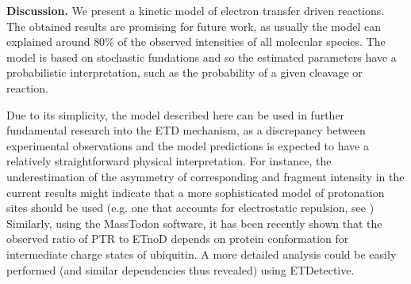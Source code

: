 \documentclass{llncs}
\begin{document}
\textbf{Discussion.}
We present a kinetic model of electron transfer driven reactions. The obtained results are promising for future work, as usually the model can explained around $80\%$ of the observed intensities of all molecular species. The model is based on stochastic fundations and so the estimated parameters have a probabilistic interpretation, such as the probability of a given cleavage or reaction.

Due to its simplicity, the model described here can be used in further fundamental research into the ETD mechanism, as a discrepancy between experimental observations and the model predictions is expected to have a relatively straightforward physical interpretation. For instance, the underestimation of the asymmetry of corresponding  and  fragment intensity in the current results might indicate that a more sophisticated model of protonation sites should be used (e.g. one that accounts for electrostatic repulsion, see \cite{Morrison2016-wc}) Similarly, using the {\sc MassTodon} software, it has been recently shown \cite{Lermyte2017-zt} that the observed ratio of PTR to ETnoD depends on protein conformation for intermediate charge states of ubiquitin. A more detailed  analysis could be easily performed (and similar dependencies thus revealed) using ETDetective.

\end{document}
